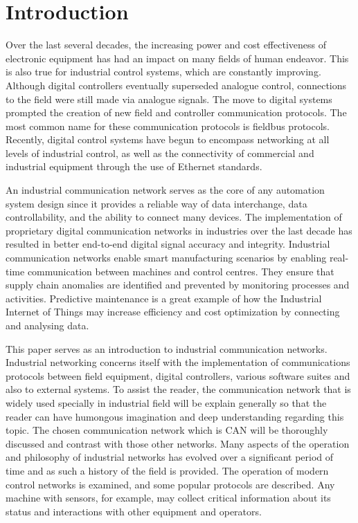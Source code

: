 \section{Introduction}
Over the last several decades, the increasing power and cost effectiveness of electronic equipment has had an impact on many fields of human endeavor. This is also true for industrial control systems, which are constantly improving. Although digital controllers eventually superseded analogue control, connections to the field were still made via analogue signals. The move to digital systems prompted the creation of new field and controller communication protocols. The most common name for these communication protocols is fieldbus protocols. Recently, digital control systems have begun to encompass networking at all levels of industrial control, as well as the connectivity of commercial and industrial equipment through the use of Ethernet standards.

An industrial communication network serves as the core of any automation system design since it provides a reliable way of data interchange, data controllability, and the ability to connect many devices. The implementation of proprietary digital communication networks in industries over the last decade has resulted in better end-to-end digital signal accuracy and integrity. Industrial communication networks enable smart manufacturing scenarios by enabling real-time communication between machines and control centres. They ensure that supply chain anomalies are identified and prevented by monitoring processes and activities. Predictive maintenance is a great example of how the Industrial Internet of Things may increase efficiency and cost optimization by connecting and analysing data.

This paper serves as an introduction to industrial communication networks. Industrial networking concerns itself with the implementation of communications protocols between field equipment, digital controllers, various software suites and also to external systems. To assist the reader, the communication network that is widely used specially in industrial field will be explain generally so that the reader can have humongous imagination and deep understanding regarding this topic. The chosen communication network which is CAN will be thoroughly discussed and contrast with those other networks. Many aspects of the operation and philosophy of industrial networks has evolved over a significant period of time and as such a history of the field is provided. The operation of modern control networks is examined, and some popular protocols are described. Any machine with sensors, for example, may collect critical information about its status and interactions with other equipment and operators.

